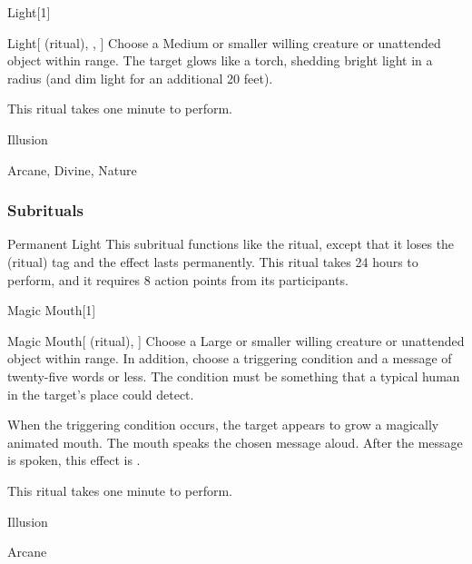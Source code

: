 \begin{spellsection}{Light}[1]


\begin{ability}{Light}[ (ritual), , ]
Choose a Medium or smaller willing creature or unattended object within \rngclose range.
The target glows like a torch, shedding bright light in a \areamed radius (and dim light for an additional 20 feet).

This ritual takes one minute to perform.
\end{ability}




 Illusion

 Arcane, Divine, Nature
\end{spellsection}


\subsubsection{Subrituals}


\begin{ability}[\nth{2}]{Permanent Light}
This subritual functions like the  ritual, except that it loses the  (ritual) tag and the effect lasts permanently.
This ritual takes 24 hours to perform, and it requires 8 action points from its participants.
\end{ability}
\vspace{0.25em}


\begin{spellsection}{Magic Mouth}[1]


\begin{ability}{Magic Mouth}[ (ritual), ]
Choose a Large or smaller willing creature or unattended object within \rngclose range.
In addition, choose a triggering condition and a message of twenty-five words or less.
The condition must be something that a typical human in the target's place could detect.

When the triggering condition occurs, the target appears to grow a magically animated mouth.
The mouth speaks the chosen message aloud.
After the message is spoken, this effect is .

This ritual takes one minute to perform.
\end{ability}




 Illusion

 Arcane
\end{spellsection}


